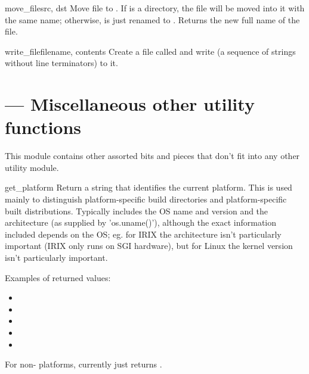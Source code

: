 \documentclass{manual}
\begin{document}
\begin{funcdesc}{move_file}{src, dst}
Move file  to . If  is a directory, the file will
be moved into it with the same name; otherwise,  is just renamed
to .  Returns the new full name of the file.
\end{funcdesc}

\begin{funcdesc}{write_file}{filename, contents}
Create a file called  and write  (a
sequence of strings without line terminators) to it.
\end{funcdesc}

\section{ --- Miscellaneous other utility functions}

This module contains other assorted bits and pieces that don't fit into 
any other utility module.

\begin{funcdesc}{get_platform}{}
Return a string that identifies the current platform.  This is used
mainly to distinguish platform-specific build directories and
platform-specific built distributions.  Typically includes the OS name
and version and the architecture (as supplied by 'os.uname()'),
although the exact information included depends on the OS; eg. for IRIX
the architecture isn't particularly important (IRIX only runs on SGI
hardware), but for Linux the kernel version isn't particularly
important.

Examples of returned values:
\begin{itemize}
\item {}
\item {}
\item {}
\item {}
\item {}
\end{itemize}

For non-\POSIX{} platforms, currently just returns .
\end{funcdesc}
\end{document}
